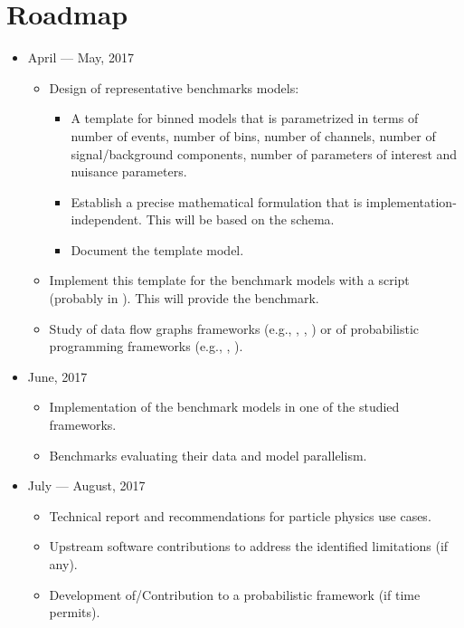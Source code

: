 \section{Roadmap}

\begin{itemize}
	\item April --- May, 2017
	      \begin{itemize}
	      	\item Design of representative benchmarks models:
	      	      \begin{itemize}
	      	      	\item A template for binned models that is parametrized in terms of number of events, number of bins, number of channels, number of signal/background components, number of parameters of interest and nuisance parameters.
	      	      	\item Establish a precise mathematical formulation that is implementation-independent.
	      	      	      This will be based on the  schema.
	      	      	\item Document the template model.
	      	      \end{itemize}
	      	\item Implement this template for the benchmark models with a  script (probably in ).
	      	      This will provide the  benchmark.
	      	\item Study of data flow graphs frameworks (e.g., , , ) or of probabilistic programming frameworks (e.g., , ).
	      \end{itemize}
	\item June, 2017
	      \begin{itemize}
	      	\item Implementation of the benchmark models in one of the studied frameworks.
	      	\item Benchmarks evaluating their data and model parallelism.
	      \end{itemize}
	\item July --- August, 2017
	      \begin{itemize}
	      	\item Technical report and recommendations for particle physics use cases.
	      	\item Upstream software contributions to address the identified limitations (if any).
	      	\item Development of/Contribution to a probabilistic framework (if time permits).
	      \end{itemize}
\end{itemize}
